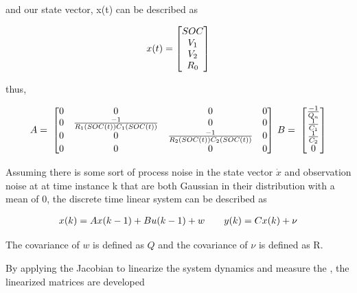 \documentclass[12pt]{article}
\begin{document}
and our state vector, x(t) can be described as 

\begin{equation}
\centering x(t) =
\begin{bmatrix}
SOC \\ V_1 \\ V_2 \\ R_0
\end{bmatrix}
\end{equation}

thus,

\begin{equation}
\centering
A = \;
\begin{bmatrix}
0 & 0 & 0 & 0 \\
0 & \frac{-1}{R_1(SOC(t))C_1(SOC(t))} & 0 & 0 \\
0 & 0 & \frac{-1}{R_2(SOC(t))C_2(SOC(t))} & 0 \\
0 & 0 & 0 & 0 \\
\end{bmatrix} \:
B = \;
\begin{bmatrix}
\frac{-1}{Q_n} \\
\frac{1}{C_1} \\
\frac{1}{C_2} \\
0 \\
\end{bmatrix}
\end{equation}

\par
Assuming there is some sort of process noise in the state vector $\dot{x}$ and observation noise  at at time instance k that are both Gaussian in their distribution with a mean of 0, the discrete time linear system can be described as 

\begin{equation}
\centering
\begin{matrix}
x(k) = Ax(k-1) + Bu(k-1) + w &&
y(k) = Cx(k) + \nu
\end{matrix}
\end{equation} 

The covariance of $w$ is defined as $Q$ and the covariance of $\nu$ is defined as R.

\par
By applying the Jacobian to linearize the system dynamics and measure the , the linearized matrices are developed 
\end{document}
